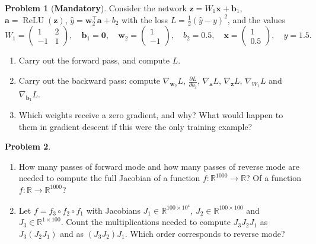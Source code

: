 \documentclass[11pt]{article}
\theoremstyle{definition}
\newtheorem{problem}{Problem}[section]
\newcommand{\mandatory}{\textcolor{red!70!black}{\textbf{Mandatory}}}
\DeclareMathOperator{\ReLU}{ReLU}
\begin{document}
\begin{problem}[\mandatory]\label{pr:backprop-numbers}
    Consider the network $\mathbf{z} = W_1\mathbf{x} + \mathbf{b}_1$, $\mathbf{a} = \ReLU(\mathbf{z})$, $\hat y = \mathbf{w}_2^\top\mathbf{a} + b_2$ with the loss $L = \frac{1}{2}(\hat y - y)^2$, and the values
    \[W_1 = \begin{pmatrix} 1 & 2 \\ -1 & 1 \end{pmatrix}, \quad \mathbf{b}_1 = \mathbf{0}, \quad \mathbf{w}_2 = \begin{pmatrix} 1 \\ -1 \end{pmatrix}, \quad b_2 = 0.5, \quad \mathbf{x} = \begin{pmatrix} 1 \\ 0.5 \end{pmatrix}, \quad y = 1.5.\]
    \begin{enumerate}[label=(\alph*)]
        \item Carry out the forward pass, and compute $L$.
        \item Carry out the backward pass: compute $\nabla_{\mathbf{w}_2} L$, $\frac{\partial L}{\partial b_2}$, $\nabla_{\mathbf{a}} L$, $\nabla_{\mathbf{z}} L$, $\nabla_{W_1} L$ and $\nabla_{\mathbf{b}_1} L$.
        \item Which weights receive a zero gradient, and why? What would happen to them in gradient descent if this were the only training example?
    \end{enumerate}
\end{problem}

\begin{problem}\label{pr:modes-cost}
    \begin{enumerate}[label=(\alph*)]
        \item How many passes of forward mode and how many passes of reverse mode are needed to compute the full Jacobian of a function $f: \mathbb{R}^{1000} \to \mathbb{R}$? Of a function $f: \mathbb{R} \to \mathbb{R}^{1000}$?
        \item Let $f = f_3 \circ f_2 \circ f_1$ with Jacobians $J_1 \in \mathbb{R}^{100 \times 10^4}$, $J_2 \in \mathbb{R}^{100 \times 100}$ and $J_3 \in \mathbb{R}^{1 \times 100}$. Count the multiplications needed to compute $J_3 J_2 J_1$ as $J_3(J_2 J_1)$ and as $(J_3 J_2)J_1$. Which order corresponds to reverse mode?
    \end{enumerate}
\end{problem}
\end{document}
